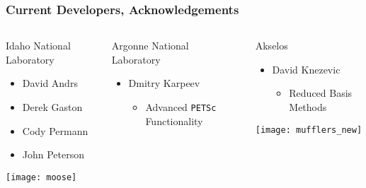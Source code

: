 \documentclass[mathserif]{beamer}
\begin{document}
\begin{frame}
\frametitle{Current Developers, Acknowledgements}
\begin{columns}

\begin{block}{Idaho National Laboratory}
\begin{itemize}
\item David Andrs
\item Derek Gaston
\item Cody Permann
\item John Peterson 
\end{itemize}
\center
\texttt{[image: moose]}
\end{block}


\begin{block}{Argonne National Laboratory}
\begin{itemize}
\item Dmitry Karpeev 
\begin{itemize}
\item Advanced \texttt{PETSc} Functionality
\end{itemize}
\end{itemize}
\end{block}

\begin{block}{Akselos}
\begin{itemize}
\item David Knezevic
\begin{itemize}
\item Reduced Basis Methods
\end{itemize}
\end{itemize}
\center
\texttt{[image: mufflers\_new]}
\end{block}

\end{columns}
\end{frame}



 
\end{document}
